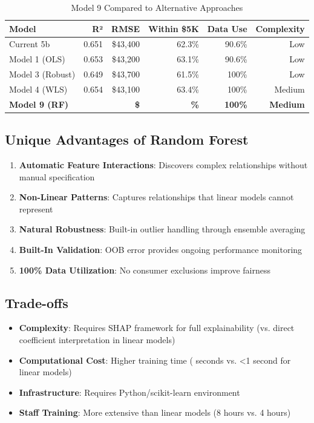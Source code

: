 \begin{table}[h]
\centering
\caption{Model 9 Compared to Alternative Approaches}
\begin{tabular}{lrrrrr}
\toprule
\textbf{Model} & \textbf{R²} & \textbf{RMSE} & \textbf{Within \$5K} & \textbf{Data Use} & \textbf{Complexity} \\
\midrule
Current 5b & 0.651 & \$43,400 & 62.3\% & 90.6\% & Low \\
Model 1 (OLS) & 0.653 & \$43,200 & 63.1\% & 90.6\% & Low \\
Model 3 (Robust) & 0.649 & \$43,700 & 61.5\% & 100\% & Low \\
Model 4 (WLS) & 0.654 & \$43,100 & 63.4\% & 100\% & Medium \\
\textbf{Model 9 (RF)} & \textbf{\ModelNineRSquaredTest{}} & \textbf{\$\ModelNineRMSETest{}} & \textbf{\ModelNineWithinFiveK{}\%} & \textbf{100\%} & \textbf{Medium} \\
\bottomrule
\end{tabular}
\label{tab:model9_comparison}
\end{table}

\subsection{Unique Advantages of Random Forest}

\begin{enumerate}
    \item \textbf{Automatic Feature Interactions}: Discovers complex relationships without manual specification
    \item \textbf{Non-Linear Patterns}: Captures relationships that linear models cannot represent
    \item \textbf{Natural Robustness}: Built-in outlier handling through ensemble averaging
    \item \textbf{Built-In Validation}: OOB error provides ongoing performance monitoring
    \item \textbf{100\% Data Utilization}: No consumer exclusions improve fairness
\end{enumerate}

\subsection{Trade-offs}

\begin{itemize}
    \item \textbf{Complexity}: Requires SHAP framework for full explainability (vs. direct coefficient interpretation in linear models)
    \item \textbf{Computational Cost}: Higher training time (\ModelNineTrainingTime{} seconds vs. <1 second for linear models)
    \item \textbf{Infrastructure}: Requires Python/scikit-learn environment
    \item \textbf{Staff Training}: More extensive than linear models (8 hours vs. 4 hours)
\end{itemize}

